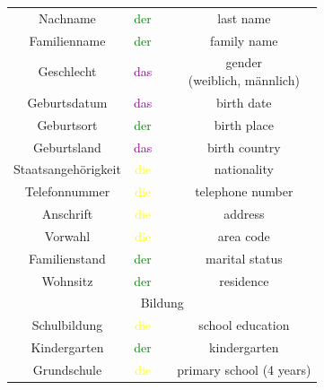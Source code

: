 \begin{center}
\begin{longtable} {|c|c|c|c|}
        Nachname               & \textcolor{green}{der}  &                        & last name                     \\
        Familienname           & \textcolor{green}{der}  &                        & family name                   \\
        Geschlecht             & \textcolor{purple}{das} &                        & \makecell{gender              \\ (weiblich, männlich)}     \\
        Geburtsdatum           & \textcolor{purple}{das} &                        & birth date                    \\
        Geburtsort             & \textcolor{green}{der}  &                        & birth place                   \\
        Geburtsland            & \textcolor{purple}{das} &                        & birth country                 \\
        Staatsangehörigkeit    & \textcolor{yellow}{die} &                        & nationality                   \\
        Telefonnummer          & \textcolor{yellow}{die} &                        & telephone number              \\
        Anschrift              & \textcolor{yellow}{die} &                        & address                       \\
        Vorwahl                & \textcolor{yellow}{die} &                        & area code                     \\
        Familienstand          & \textcolor{green}{der}  &                        & marital status                \\
        Wohnsitz               & \textcolor{green}{der}  &                        & residence                     \\
        \hline
        \multicolumn{4}{|c|}{Bildung}                                                                             \\
        \hline
        Schulbildung           & \textcolor{yellow}{die} &                        & school education              \\
        Kindergarten           & \textcolor{green}{der}  &                        & kindergarten                  \\
        Grundschule            & \textcolor{yellow}{die} &                        & primary school (4 years)      \\

\end{longtable}
\end{center}
